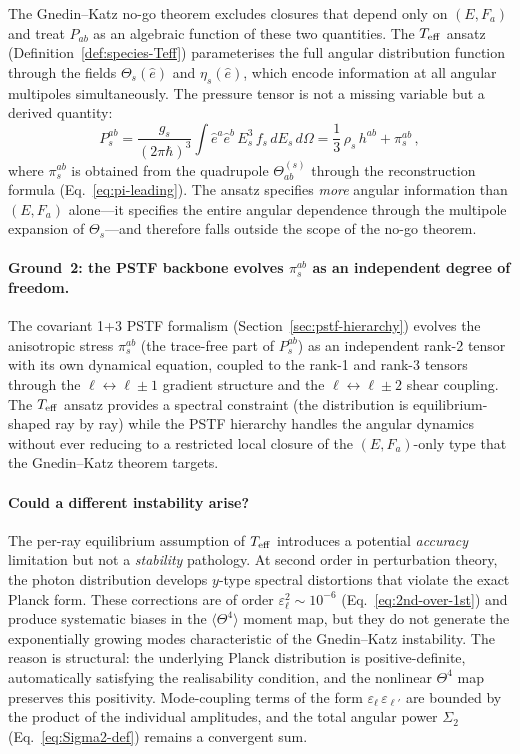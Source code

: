 The Gnedin--Katz no-go theorem excludes closures that
depend only on $(E, F_a)$ and treat $P_{ab}$ as an
algebraic function of these two quantities.  The $T_{\mathrm{eff}}$
ansatz
(Definition~\ref{def:species-Teff}) parameterises the
full angular distribution function through the fields
$\Theta_s(\hat{e})$ and $\eta_s(\hat{e})$, which
encode information at all angular multipoles
simultaneously.  The pressure tensor is not a missing
variable but a derived quantity:
\begin{equation}\label{eq:Pab-derived}
P_s^{ab}
= \frac{g_s}{(2\pi\hbar)^3}
  \int \hat{e}^a \hat{e}^b\,
  E_s^3\, f_s\, dE_s\, d\Omega
= \frac{1}{3}\,\rho_s\, h^{ab}
  + \pi_s^{ab}\,,
\end{equation}
where $\pi_s^{ab}$ is obtained from the quadrupole
$\Theta^{(s)}_{ab}$ through the reconstruction formula
(Eq.~\ref{eq:pi-leading}).  The ansatz specifies
\emph{more} angular information than $(E, F_a)$
alone---it specifies the entire angular dependence
through the multipole expansion of $\Theta_s$---and
therefore falls outside the scope of the no-go theorem.


\paragraph{Ground~2: the PSTF backbone evolves
$\pi_s^{ab}$ as an independent degree of freedom.}

The covariant 1+3 PSTF formalism
(Section~\ref{sec:pstf-hierarchy}) evolves the
anisotropic stress $\pi_s^{ab}$ (the trace-free part
of $P_s^{ab}$) as an independent rank-2 tensor with its
own dynamical equation, coupled to the rank-1 and rank-3
tensors through the $\ell \leftrightarrow \ell \pm 1$
gradient structure and the
$\ell \leftrightarrow \ell \pm 2$ shear coupling.  The
$T_{\mathrm{eff}}$ ansatz provides a spectral constraint (the
distribution is equilibrium-shaped ray by ray) while the
PSTF hierarchy handles the angular dynamics without ever
reducing to a restricted local closure of the
$(E, F_a)$-only type that the Gnedin--Katz theorem
targets.


\paragraph{Could a different instability arise?}

The per-ray equilibrium assumption of $T_{\mathrm{eff}}$ introduces
a potential \emph{accuracy} limitation but not a
\emph{stability} pathology.  At second order in
perturbation theory, the photon distribution develops
$y$-type spectral distortions that violate the exact
Planck form.  These corrections are of order
$\varepsilon_\ell^2 \sim 10^{-6}$
(Eq.~\ref{eq:2nd-over-1st}) and produce systematic
biases in the $\langle \Theta^4 \rangle$ moment map,
but they do not generate the exponentially growing modes
characteristic of the Gnedin--Katz instability.  The
reason is structural: the underlying Planck distribution
is positive-definite, automatically satisfying the
realisability condition, and the nonlinear $\Theta^4$
map preserves this positivity.  Mode-coupling terms of
the form
$\varepsilon_\ell\,\varepsilon_{\ell'}$ are bounded
by the product of the individual amplitudes, and the
total angular power $\Sigma_2$
(Eq.~\ref{eq:Sigma2-def}) remains a convergent sum.

